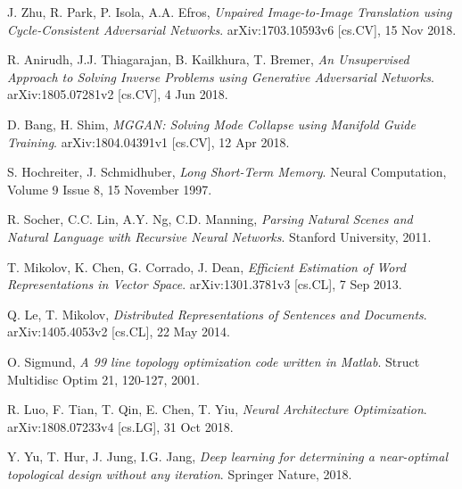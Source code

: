 \documentclass[a4paper]{article}
\begin{document}
\begin{thebibliography}{999}
  J. Zhu, R. Park, P. Isola, A.A. Efros,
  \emph{Unpaired Image-to-Image Translation using Cycle-Consistent Adversarial Networks}.
  arXiv:1703.10593v6 [cs.CV],
  15 Nov 2018.

  R. Anirudh, J.J. Thiagarajan, B. Kailkhura, T. Bremer,
  \emph{An Unsupervised Approach to Solving Inverse Problems using Generative Adversarial Networks}.
  arXiv:1805.07281v2 [cs.CV],
  4 Jun 2018.

  D. Bang, H. Shim,
  \emph{MGGAN: Solving Mode Collapse using Manifold Guide Training}.
  arXiv:1804.04391v1 [cs.CV],
  12 Apr 2018.

  S. Hochreiter, J. Schmidhuber,
  \emph{Long Short-Term Memory}.
  Neural Computation,
  Volume 9 Issue 8,
  15 November 1997.

  R. Socher, C.C. Lin, A.Y. Ng, C.D. Manning,
  \emph{Parsing Natural Scenes and Natural Language with Recursive Neural Networks}.
  Stanford University,
  2011.

  T. Mikolov, K. Chen, G. Corrado, J. Dean,
  \emph{Efficient Estimation of Word Representations in Vector Space}.
  arXiv:1301.3781v3 [cs.CL],
  7 Sep 2013.

  Q. Le, T. Mikolov,
  \emph{Distributed Representations of Sentences and Documents}.
  arXiv:1405.4053v2 [cs.CL],
  22 May 2014.

  O. Sigmund,
  \emph{A 99 line topology optimization code written in Matlab}.
  Struct Multidisc Optim 21,
  120-127,
  2001.


  R. Luo, F. Tian, T. Qin, E. Chen, T. Yiu,
  \emph{Neural Architecture Optimization}.
  arXiv:1808.07233v4 [cs.LG],
  31 Oct 2018.

  Y. Yu, T. Hur, J. Jung, I.G. Jang,
  \emph{Deep learning for determining a near-optimal topological design without any iteration}.
  Springer Nature,
  2018.

\end{thebibliography}
\end{document}
